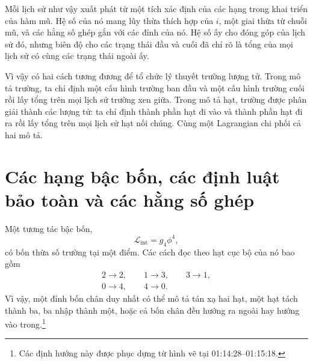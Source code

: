 Mỗi lịch sử như vậy xuất phát từ một tích xác định của các hạng trong khai triển của hàm mũ. Hệ số của nó mang lũy thừa thích hợp của \(i\), một giai thừa từ chuỗi mũ, và các hằng số ghép gắn với các đỉnh của nó. Hệ số ấy cho đóng góp của lịch sử đó, nhưng biên độ cho các trạng thái đầu và cuối đã chỉ rõ là tổng của mọi lịch sử có cùng các trạng thái ngoài ấy.

\begin{classroomqa}
\end{classroomqa}

Vì vậy có hai cách tương đương để tổ chức lý thuyết trường lượng tử. Trong mô tả trường, ta chỉ định một cấu hình trường ban đầu và một cấu hình trường cuối rồi lấy tổng trên mọi lịch sử trường xen giữa. Trong mô tả hạt, trường được phân giải thành các lượng tử: ta chỉ định thành phần hạt đi vào và thành phần hạt đi ra rồi lấy tổng trên mọi lịch sử hạt nối chúng. Cùng một Lagrangian chi phối cả hai mô tả.

\section{Các hạng bậc bốn, các định luật bảo toàn và các hằng số ghép}

Một tương tác bậc bốn,
\begin{equation}
\mathcal{L}_{\mathrm{int}}=g_4\phi^4,
\end{equation}
có bốn thừa số trường tại một điểm. Các cách đọc theo hạt cục bộ của nó bao gồm
\begin{equation}
\begin{gathered}
2\longrightarrow2,
\qquad
1\longrightarrow3,
\qquad
3\longrightarrow1,\\
0\longrightarrow4,
\qquad
4\longrightarrow0.
\end{gathered}
\end{equation}
Vì vậy, một đỉnh bốn chân duy nhất có thể mô tả tán xạ hai hạt, một hạt tách thành ba, ba nhập thành một, hoặc cả bốn chân đều hướng ra ngoài hay hướng vào trong.\footnote{Các định hướng này được phục dựng từ hình vẽ tại 01:14:28--01:15:18.}

